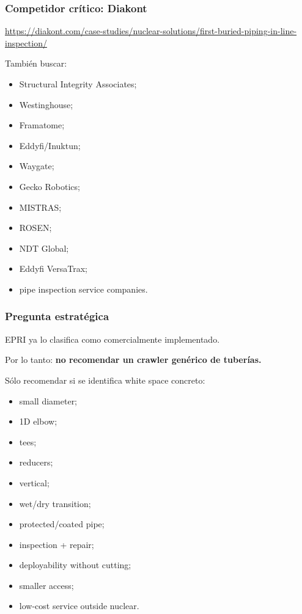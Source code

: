 \documentclass[11pt,a4paper]{article}
\begin{document}
\subsubsection*{Competidor crítico: Diakont}
\url{https://diakont.com/case-studies/nuclear-solutions/first-buried-piping-in-line-inspection/}

También buscar:

\begin{itemize}
\item Structural Integrity Associates;
\item Westinghouse;
\item Framatome;
\item Eddyfi/Inuktun;
\item Waygate;
\item Gecko Robotics;
\item MISTRAS;
\item ROSEN;
\item NDT Global;
\item Eddyfi VersaTrax;
\item pipe inspection service companies.
\end{itemize}


\subsubsection*{Pregunta estratégica}
EPRI ya lo clasifica como comercialmente implementado.

Por lo tanto:
\textbf{no recomendar un crawler genérico de tuberías.}

Sólo recomendar si se identifica white space concreto:

\begin{itemize}
\item small diameter;
\item 1D elbow;
\item tees;
\item reducers;
\item vertical;
\item wet/dry transition;
\item protected/coated pipe;
\item inspection + repair;
\item deployability without cutting;
\item smaller access;
\item low-cost service outside nuclear.
\end{itemize}
\end{document}
